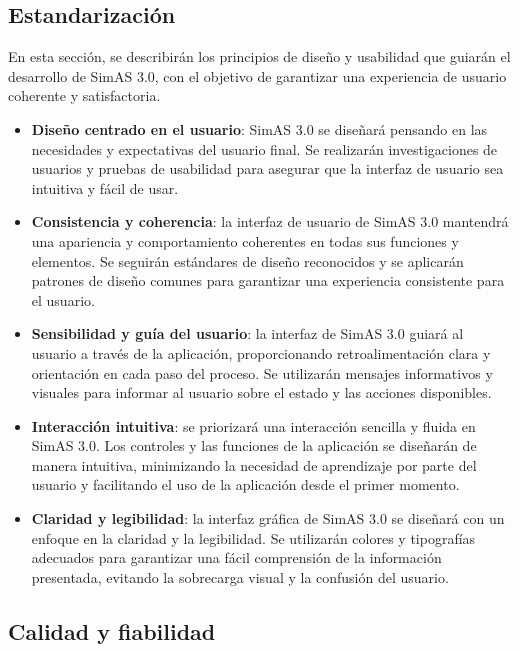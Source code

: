 \subsection{Estandarización}

En esta sección, se describirán los principios de diseño y usabilidad que guiarán el desarrollo de SimAS 3.0, con el objetivo de garantizar una experiencia de usuario coherente y satisfactoria.

\begin{itemize}
    \item \textbf{Diseño centrado en el usuario}: SimAS 3.0 se diseñará pensando en las necesidades y expectativas del usuario final. Se realizarán investigaciones de usuarios y pruebas de usabilidad para asegurar que la interfaz de usuario sea intuitiva y fácil de usar.
    
    \item \textbf{Consistencia y coherencia}: la interfaz de usuario de SimAS 3.0 mantendrá una apariencia y comportamiento coherentes en todas sus funciones y elementos. Se seguirán estándares de diseño reconocidos y se aplicarán patrones de diseño comunes para garantizar una experiencia consistente para el usuario.
    
    \item \textbf{Sensibilidad y guía del usuario}: la interfaz de SimAS 3.0 guiará al usuario a través de la aplicación, proporcionando retroalimentación clara y orientación en cada paso del proceso. Se utilizarán mensajes informativos y visuales para informar al usuario sobre el estado y las acciones disponibles.
    
    \item \textbf{Interacción intuitiva}: se priorizará una interacción sencilla y fluida en SimAS 3.0. Los controles y las funciones de la aplicación se diseñarán de manera intuitiva, minimizando la necesidad de aprendizaje por parte del usuario y facilitando el uso de la aplicación desde el primer momento.
    
    \item \textbf{Claridad y legibilidad}: la interfaz gráfica de SimAS 3.0 se diseñará con un enfoque en la claridad y la legibilidad. Se utilizarán colores y tipografías adecuados para garantizar una fácil comprensión de la información presentada, evitando la sobrecarga visual y la confusión del usuario.
\end{itemize}


\subsection{Calidad y fiabilidad}

